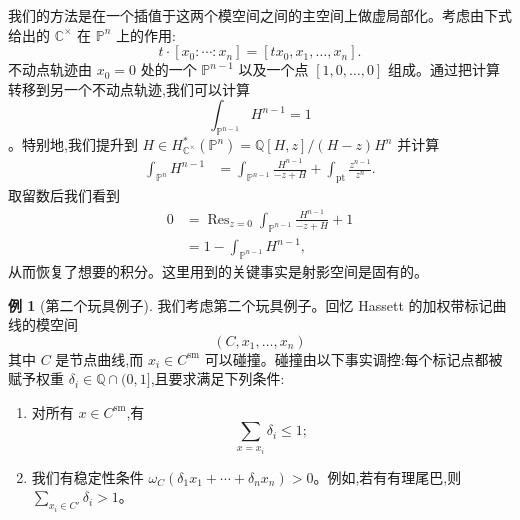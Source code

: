 \documentclass{amsart}
\theoremstyle{definition}
\newtheorem{exm}[thm]{例}
\theoremstyle{remark}
\theoremstyle{plain}
\theoremstyle{definition}
\theoremstyle{remark}
\newcommand{\C}{\mathbb{C}}
\newcommand{\Q}{\mathbb{Q}}
\renewcommand{\P}{\mathbb{P}}
\newcommand{\mr}[1]{\mathrm{#1}}
\newcommand{\on}[1]{\operatorname{#1}}
\newcommand{\1}{\mathbf{1}}
\newcommand{\2}{\mathbf{2}}
\newcommand{\3}{\mathbf{3}}
\begin{document}
我们的方法是在一个插值于这两个模空间之间的主空间上做虚局部化。考虑由下式给出的 \(\C^{\times}\) 在 \(\P^n\) 上的作用:
\[ t \cdot [x_0 : \cdots : x_n] = [t x_0, x_1, \ldots, x_n]. \]
不动点轨迹由 \(x_0 = 0\) 处的一个 \(\P^{n-1}\) 以及一个点 \([1, 0, \ldots, 0]\) 组成。通过把计算转移到另一个不动点轨迹,我们可以计算
\[ \int_{\P^{n-1}} H^{n-1} = 1 \]
。特别地,我们提升到 \(H \in H_{\C^{\times}}^* (\P^n) = \Q[H,z] / (H-z)H^n\) 并计算
\begin{align*}
    \int_{\P^n} H^{n-1} &= \int_{\P^{n-1}} \frac{H^{n-1}}{-z+H} + \int_{\mr{pt}} \frac{z^{n-1}}{z^n}.
\end{align*}
取留数后我们看到
\begin{align*}
    0 &= \on{Res}_{z = 0}\int_{\P^{n-1}} \frac{H^{n-1}}{-z+H} + 1 \\
    &= 1 - \int_{\P^{n-1}}H^{n-1},
\end{align*}
从而恢复了想要的积分。这里用到的关键事实是射影空间是固有的。

\begin{exm}[第二个玩具例子]
    我们考虑第二个玩具例子。回忆 Hassett 的加权带标记曲线的模空间
    \[ (C, x_1, \ldots, x_n) \]
    其中 \(C\) 是节点曲线,而 \(x_i \in C^{\mr{sm}}\) 可以碰撞。碰撞由以下事实调控:每个标记点都被赋予权重 \(\delta_i \in \Q \cap (0,1]\),且要求满足下列条件:
    \begin{enumerate}
        \item 对所有 \(x \in C^{\mr{sm}}\),有
            \[ \sum_{x = x_i} \delta_i \leq 1; \]
        \item 我们有稳定性条件 \(\omega_C(\delta_1 x_1 + \cdots + \delta_n x_n) > 0\)。例如,若有有理尾巴,则 \(\sum_{x_i \in C'} \delta_i > 1\)。
    \end{enumerate}
\end{exm}
\end{document}
